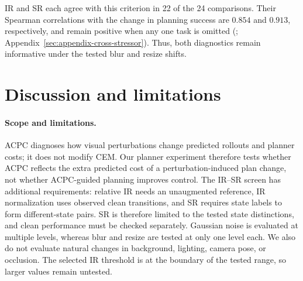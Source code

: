 \documentclass{article}
\begin{document}
IR and SR each agree with this criterion in 22 of the 24 comparisons. Their
Spearman correlations with the change in planning success are $0.854$ and
$0.913$, respectively, and remain positive when any one task is omitted
(;
Appendix~\ref{sec:appendix-cross-stressor}). Thus, both diagnostics remain
informative under the tested blur and resize shifts.



\section{Discussion and limitations}\label{sec:disc}

\paragraph{Scope and limitations.}

ACPC diagnoses how visual perturbations change predicted rollouts and planner
costs; it does not modify CEM. Our planner experiment therefore tests whether
ACPC reflects the extra predicted cost of a perturbation-induced plan change,
not whether ACPC-guided planning improves control.
The IR--SR screen has additional requirements: relative IR needs an unaugmented
reference, IR normalization uses observed clean transitions, and SR requires
state labels to form different-state pairs. SR is therefore limited to the
tested state distinctions, and clean performance must be checked separately.
Gaussian noise is evaluated at multiple levels, whereas blur and resize are
tested at only one level each. We also do not evaluate natural changes in
background, lighting, camera pose, or occlusion. The selected IR threshold is
at the boundary of the tested range, so larger values remain untested.
\end{document}
